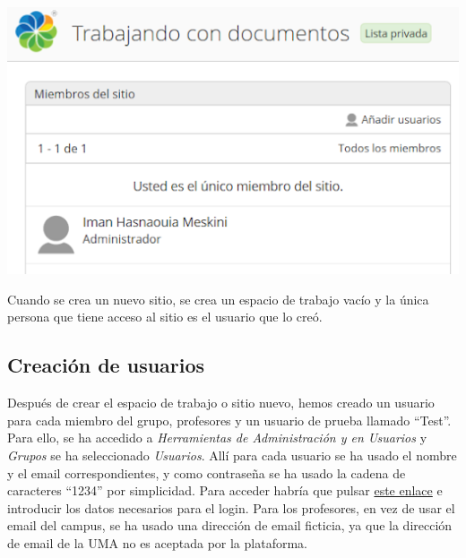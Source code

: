 \documentclass{article}
\begin{document}
\begin{center}
\includegraphics[scale=0.5]{images/workspace3.png}
\end{center}

Cuando se crea un nuevo sitio, se crea un espacio de trabajo vacío y la única persona que tiene acceso al sitio es el usuario que lo creó.

\subsection{Creación de usuarios}

Después de crear el espacio de trabajo o sitio nuevo, hemos creado un usuario para cada miembro del grupo, profesores y un usuario de prueba llamado “Test”. Para ello, se ha accedido a \textit{Herramientas de Administración y en Usuarios} y \textit{Grupos} se ha seleccionado \textit{Usuarios}. Allí para cada usuario se ha usado el nombre y el email correspondientes, y como contraseña se ha usado la cadena de caracteres “1234” por simplicidad.  Para acceder habría que pulsar \href{https://blctbt.trial.alfresco.com/share/page?mkt_tok=eyJpIjoiWXpRM05EbGpOamszWkRJeiIsInQiOiJSblJPbVFTVERZTnJhWHI5TGM4dHZXWkRHdmhlWlN0NlI0ZEQzZkgrc0ZiNElJaUo3K2k1a3RzOUh4UFNSaXU2RHlHTVVHYUhnblNGVFY0V1gyZlNZN0wxSk82anZudStVT1VKcWZqNVlGVlwvbUZmY01nRlVZVTRTZHRxbUZyeUUifQ\%3D\%3D}{este enlace} e introducir los datos necesarios para el login. Para los profesores, en vez de usar el email del campus, se ha usado una dirección de email ficticia, ya que la dirección de email de la UMA no es aceptada por la plataforma.
\end{document}
